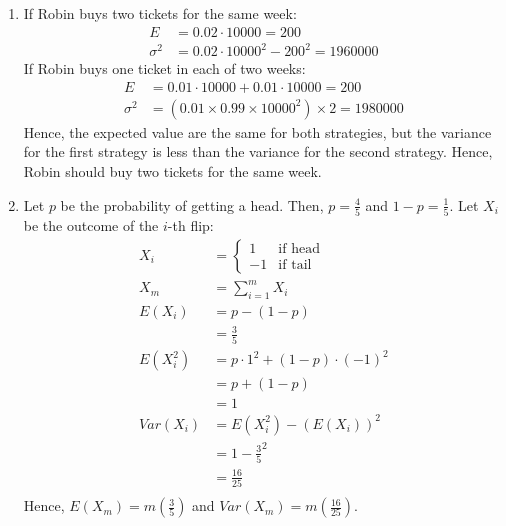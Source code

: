 \documentclass{article}
\begin{document}
\begin{enumerate}[label=(\alph*)]
    \item If Robin buys two tickets for the same week:
          \begin{align*}
              E        & = 0.02 \cdot 10000 = 200               \\
              \sigma^2 & = 0.02 \cdot 10000^2 - 200^2 = 1960000
          \end{align*}
          If Robin buys one ticket in each of two weeks:
          \begin{align*}
              E        & = 0.01 \cdot 10000 + 0.01 \cdot 10000 = 200            \\
              \sigma^2 & = (0.01 \times 0.99 \times 10000^2) \times 2 = 1980000
          \end{align*}
          Hence, the expected value are the same for both strategies, but the variance for the first strategy is less than the variance for the second strategy. Hence, Robin should buy two tickets for the same week.
    \item Let \( p \) be the probability of getting a head. Then, \( p = \frac{4}{5} \) and \( 1-p = \frac{1}{5} \). Let $X_i$ be the outcome of the $i$-th flip:
          \begin{align*}
              X_i      & = \begin{cases}
                               1  & \text{if head} \\
                               -1 & \text{if tail}
                           \end{cases}              \\
              X_m      & = \sum_{i=1}^{m} X_i               \\
              E(X_i)   & = p - (1-p)                        \\
                       & = \frac35                          \\
              E(X_i^2) & = p \cdot 1^2 + (1-p) \cdot (-1)^2 \\
                       & = p + (1-p)                        \\
                       & = 1                                \\
              Var(X_i) & = E(X_i^2) - (E(X_i))^2            \\
                       & = 1 - {\frac35}^2                  \\
                       & = \frac{16}{25}                    \\
          \end{align*}
          Hence, $E(X_m) = m(\frac{3}{5})$ and $Var(X_m) = m(\frac{16}{25})$.
\end{enumerate}
\end{document}
